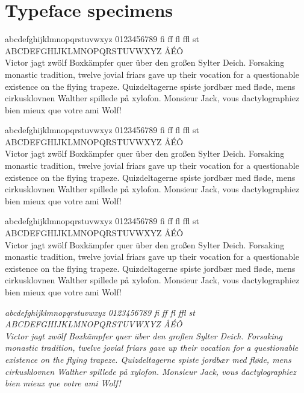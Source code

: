 \chapter{Typeface specimens}

\newcommand{\fontspecimen}{\noindent abcdefghijklmnopqrstuvwxyz 0123456789 fi ff fl ffl st\\ ABCDEFGHIJKLMNOPQRSTUVWXYZ ÅÉÔ \\ Victor jagt zwölf Boxkämpfer quer über den großen Sylter Deich. Forsaking monastic tradition, twelve jovial friars gave up their vocation for a questionable existence on the flying trapeze. Quizdeltagerne spiste jordbær med fløde, mens cirkusklovnen Walther spillede på xylofon. Monsieur Jack, vous dactylographiez bien mieux que votre ami Wolf! \bigskip}

\fontsize{8pt}{8pt}
\selectfont
\fontspecimen

\fontsize{10pt}{10pt}
\selectfont
\fontspecimen

\fontsize{14pt}{14pt}
\selectfont
\fontspecimen

\noindent
\emph{\fontspecimen}

